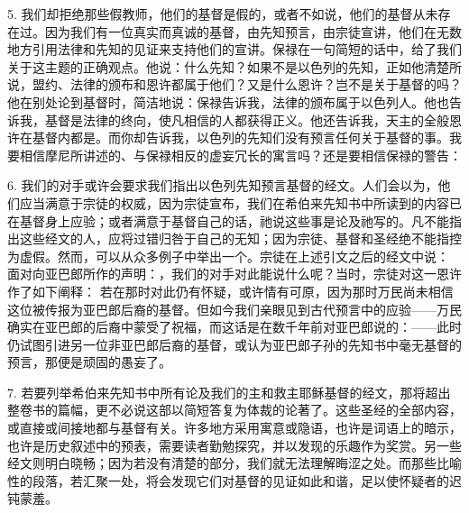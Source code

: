 5. 我们却拒绝那些假教师，他们的基督是假的，或者不如说，他们的基督从未存在过。因为我们有一位真实而真诚的基督，由先知预言，由宗徒宣讲，他们在无数地方引用法律和先知的见证来支持他们的宣讲。保禄在一句简短的话中，给了我们关于这主题的正确观点。他说：什么先知？如果不是以色列的先知，正如他清楚所说，盟约、法律的颁布和恩许都属于他们？又是什么恩许？岂不是关于基督的吗？他在别处论到基督时，简洁地说：保禄告诉我，法律的颁布属于以色列人。他也告诉我，基督是法律的终向，使凡相信的人都获得正义。他还告诉我，天主的全般恩许在基督内都是。而你却告诉我，以色列的先知们没有预言任何关于基督的事。我要相信摩尼所讲述的、与保禄相反的虚妄冗长的寓言吗？还是要相信保禄的警告：\par

6. 我们的对手或许会要求我们指出以色列先知预言基督的经文。人们会以为，他们应当满意于宗徒的权威，因为宗徒宣布，我们在希伯来先知书中所读到的内容已在基督身上应验；或者满意于基督自己的话，祂说这些事是论及祂写的。凡不能指出这些经文的人，应将过错归咎于自己的无知；因为宗徒、基督和圣经绝不能指控为虚假。然而，可以从众多例子中举出一个。宗徒在上述引文之后的经文中说：  面对向亚巴郎所作的声明：，我们的对手对此能说什么呢？当时，宗徒对这一恩许作了如下阐释：  若在那时对此仍有怀疑，或许情有可原，因为那时万民尚未相信这位被传报为亚巴郎后裔的基督。但如今我们亲眼见到古代预言中的应验——万民确实在亚巴郎的后裔中蒙受了祝福，而这话是在数千年前对亚巴郎说的：——此时仍试图引进另一位非亚巴郎后裔的基督，或认为亚巴郎子孙的先知书中毫无基督的预言，那便是顽固的愚妄了。\par

7. 若要列举希伯来先知书中所有论及我们的主和救主耶稣基督的经文，那将超出整卷书的篇幅，更不必说这部以简短答复为体裁的论著了。这些圣经的全部内容，或直接或间接地都与基督有关。许多地方采用寓意或隐语，也许是词语上的暗示，也许是历史叙述中的预表，需要读者勤勉探究，并以发现的乐趣作为奖赏。另一些经文则明白晓畅；因为若没有清楚的部分，我们就无法理解晦涩之处。而那些比喻性的段落，若汇聚一处，将会发现它们对基督的见证如此和谐，足以使怀疑者的迟钝蒙羞。\par

